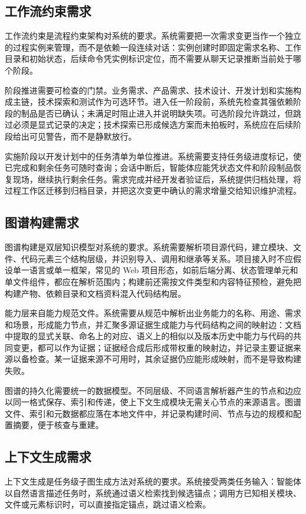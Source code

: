 \subsection{工作流约束需求}
工作流约束是流程约束架构对系统的要求。系统需要把一次需求变更当作一个独立的过程实例来管理，而不是依赖一段连续对话：实例创建时即固定需求名称、工作目录和初始状态，后续命令凭实例标识定位，而不需要从聊天记录推断当前处于哪个阶段。

阶段推进需要可检查的门禁。业务需求、产品需求、技术设计、开发计划和实施构成主链，技术探索和测试作为可选环节。进入任一阶段前，系统先检查其强依赖阶段的制品是否已确认；未满足时阻止进入并说明缺失项。可选阶段允许跳过，但跳过必须是显式记录的决定；技术探索已形成候选方案而未拍板时，系统应在后续阶段给出可见警告，而不是静默放行。

实施阶段以开发计划中的任务清单为单位推进。系统需要支持任务级进度标记，使已完成和剩余任务可随时查询；会话中断后，智能体应能凭状态文件和阶段制品恢复现场，继续执行剩余任务。需求完成并经开发者验证后，系统提供归档处理，将过程工作区迁移到归档目录，并把这次变更中确认的需求增量交给知识维护流程。


\subsection{图谱构建需求}
图谱构建是双层知识模型对系统的要求。系统需要解析项目源代码，建立模块、文件、代码元素三个结构层级，并识别导入、调用和继承等关系。项目接入时不应假设单一语言或单一框架，常见的 Web 项目形态，如前后端分离、状态管理单元和单文件组件，都应在解析范围内；构建前还需按文件类型和内容特征预检，避免把构建产物、依赖目录和文档资料混入代码结构层。

能力层来自能力规范文件。系统需要从规范中解析出业务能力的名称、用途、需求和场景，形成能力节点，并汇聚多源证据生成能力与代码结构之间的映射边：文档中提取的显式关联、命名上的对应、语义上的相似以及版本历史中能力与代码的共同变更，都可以作为证据；证据经合成后形成带权重的映射边，并记录主要证据来源以备检查。某一证据来源不可用时，其余证据仍应能形成映射，而不是导致构建失败。

图谱的持久化需要统一的数据模型。不同层级、不同语言解析器产生的节点和边应以同一格式保存、索引和传递，使上下文生成模块无需关心节点的来源语言。图谱文件、索引和元数据都应落在本地文件中，并记录构建时间、节点与边的规模和配置摘要，便于核查与重建。


\subsection{上下文生成需求}
上下文生成是任务级子图生成方法对系统的要求。系统接受两类任务输入：智能体以自然语言描述任务时，系统通过语义检索找到候选锚点；调用方已知相关模块、文件或元素标识时，可以直接指定锚点，跳过语义检索。

